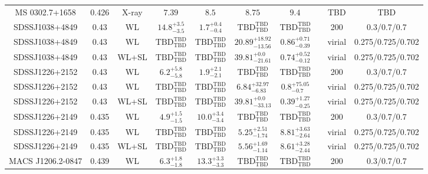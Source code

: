 \begin{table}
\begin{tabular}{cccccccccc}
MS 0302.7+1658 & 0.426 & X-ray & ${7.39}^{}_{}$ & ${8.5}^{}_{}$ & ${8.75}^{}_{}$ & ${9.4}^{}_{}$ & \citet{MO99.1} & TBD & TBD \\
SDSSJ1038+4849 & 0.43 & WL & ${14.8}^{+3.5}_{-3.5}$ & ${1.7}^{+0.4}_{-0.4}$ & ${\mathrm{TBD}}^{\mathrm{TBD}}_{\mathrm{TBD}}$ & ${\mathrm{TBD}}^{\mathrm{TBD}}_{\mathrm{TBD}}$ & \citet{SE14.1} & 200 & 0.3/0.7/0.7 \\
SDSSJ1038+4849 & 0.43 & WL & ${\mathrm{TBD}}^{\mathrm{TBD}}_{\mathrm{TBD}}$ & ${\mathrm{TBD}}^{\mathrm{TBD}}_{\mathrm{TBD}}$ & ${20.89}^{+18.92}_{-13.56}$ & ${0.86}^{+0.71}_{-0.39}$ & \citet{OG12.1} & virial & 0.275/0.725/0.702 \\
SDSSJ1038+4849 & 0.43 & WL+SL & ${\mathrm{TBD}}^{\mathrm{TBD}}_{\mathrm{TBD}}$ & ${\mathrm{TBD}}^{\mathrm{TBD}}_{\mathrm{TBD}}$ & ${39.81}^{+0.0}_{-21.61}$ & ${0.74}^{+0.52}_{-0.12}$ & \citet{OG12.1} & virial & 0.275/0.725/0.702 \\
SDSSJ1226+2152 & 0.43 & WL & ${6.2}^{+5.8}_{-5.8}$ & ${1.9}^{+2.1}_{-2.1}$ & ${\mathrm{TBD}}^{\mathrm{TBD}}_{\mathrm{TBD}}$ & ${\mathrm{TBD}}^{\mathrm{TBD}}_{\mathrm{TBD}}$ & \citet{SE14.1} & 200 & 0.3/0.7/0.7 \\
SDSSJ1226+2152 & 0.43 & WL & ${\mathrm{TBD}}^{\mathrm{TBD}}_{\mathrm{TBD}}$ & ${\mathrm{TBD}}^{\mathrm{TBD}}_{\mathrm{TBD}}$ & ${6.84}^{+32.97}_{-6.83}$ & ${0.8}^{+75.05}_{-0.7}$ & \citet{OG12.1} & virial & 0.275/0.725/0.702 \\
SDSSJ1226+2152 & 0.43 & WL+SL & ${\mathrm{TBD}}^{\mathrm{TBD}}_{\mathrm{TBD}}$ & ${\mathrm{TBD}}^{\mathrm{TBD}}_{\mathrm{TBD}}$ & ${39.81}^{+0.0}_{-33.13}$ & ${0.39}^{+1.27}_{-0.25}$ & \citet{OG12.1} & virial & 0.275/0.725/0.702 \\
SDSSJ1226+2149 & 0.435 & WL & ${4.9}^{+1.5}_{-1.5}$ & ${10.0}^{+3.4}_{-3.4}$ & ${\mathrm{TBD}}^{\mathrm{TBD}}_{\mathrm{TBD}}$ & ${\mathrm{TBD}}^{\mathrm{TBD}}_{\mathrm{TBD}}$ & \citet{SE14.1} & 200 & 0.3/0.7/0.7 \\
SDSSJ1226+2149 & 0.435 & WL & ${\mathrm{TBD}}^{\mathrm{TBD}}_{\mathrm{TBD}}$ & ${\mathrm{TBD}}^{\mathrm{TBD}}_{\mathrm{TBD}}$ & ${5.25}^{+2.51}_{-1.74}$ & ${8.81}^{+3.63}_{-2.64}$ & \citet{OG12.1} & virial & 0.275/0.725/0.702 \\
SDSSJ1226+2149 & 0.435 & WL+SL & ${\mathrm{TBD}}^{\mathrm{TBD}}_{\mathrm{TBD}}$ & ${\mathrm{TBD}}^{\mathrm{TBD}}_{\mathrm{TBD}}$ & ${5.56}^{+1.69}_{-1.14}$ & ${8.61}^{+3.28}_{-2.44}$ & \citet{OG12.1} & virial & 0.275/0.725/0.702 \\
MACS J1206.2-0847 & 0.439 & WL & ${6.3}^{+1.8}_{-1.8}$ & ${13.3}^{+3.3}_{-3.3}$ & ${\mathrm{TBD}}^{\mathrm{TBD}}_{\mathrm{TBD}}$ & ${\mathrm{TBD}}^{\mathrm{TBD}}_{\mathrm{TBD}}$ & \citet{SE14.1} & 200 & 0.3/0.7/0.7 \\

\end{tabular}
\end{table}
